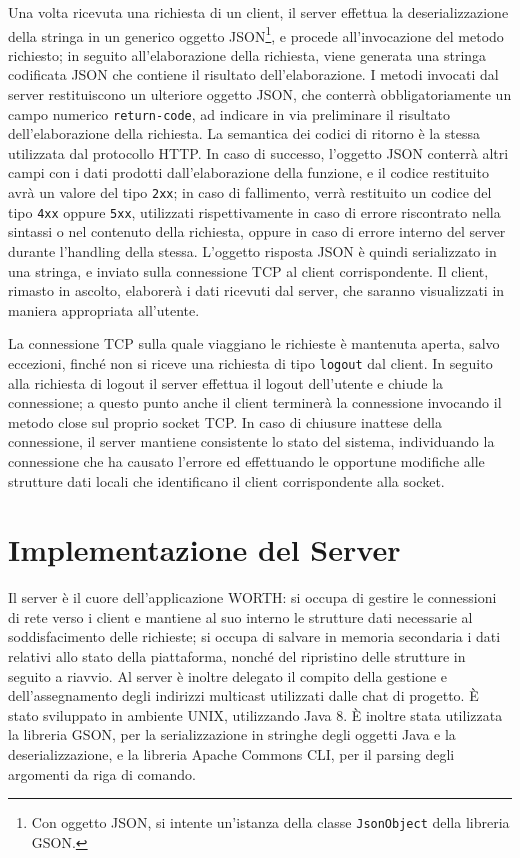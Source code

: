 \documentclass{article}
\begin{document}
Una volta ricevuta una richiesta di un client, il server effettua la deserializzazione della stringa in un generico oggetto JSON\footnote{Con oggetto JSON, si intente un'istanza della classe \texttt{JsonObject} della libreria GSON.}, e procede all'invocazione del metodo richiesto; in seguito all'elaborazione della richiesta, viene generata una stringa codificata JSON che contiene il risultato dell'elaborazione. I metodi invocati dal server restituiscono un ulteriore oggetto JSON, che conterrà obbligatoriamente un campo numerico \texttt{return-code}, ad indicare in via preliminare il risultato dell'elaborazione della richiesta. La semantica dei codici di ritorno è la stessa utilizzata dal protocollo HTTP. In caso di successo, l'oggetto JSON conterrà altri campi con i dati prodotti dall'elaborazione della funzione, e il codice restituito avrà un valore del tipo \texttt{2xx}; in caso di fallimento, verrà restituito un codice del tipo \texttt{4xx} oppure \texttt{5xx}, utilizzati rispettivamente in caso di errore riscontrato nella sintassi o nel contenuto della richiesta, oppure in caso di errore interno del server durante l'handling della stessa. L'oggetto risposta JSON è quindi serializzato in una stringa, e inviato sulla connessione TCP al client corrispondente.
Il client, rimasto in ascolto, elaborerà i dati ricevuti dal server, che saranno visualizzati in maniera appropriata all'utente.

La connessione TCP sulla quale viaggiano le richieste è mantenuta aperta, salvo eccezioni, finché non si riceve una richiesta di tipo \texttt{logout} dal client. In seguito alla richiesta di logout il server effettua il logout dell'utente e chiude la connessione; a questo punto anche il client terminerà la connessione invocando il metodo close sul proprio socket TCP. In caso di chiusure inattese della connessione, il server mantiene consistente lo stato del sistema, individuando la connessione che ha causato l'errore ed effettuando le opportune modifiche alle strutture dati locali che identificano il client corrispondente alla socket.

\section{Implementazione del Server}
Il server è il cuore dell'applicazione WORTH: si occupa di gestire le connessioni di rete verso i client e mantiene al suo interno le strutture dati necessarie al soddisfacimento delle richieste; si occupa di salvare in memoria secondaria i dati relativi allo stato della piattaforma, nonché del ripristino delle strutture in seguito a riavvio. Al server è inoltre delegato il compito della gestione e dell'assegnamento degli indirizzi multicast utilizzati dalle chat di progetto.
È stato sviluppato in ambiente UNIX, utilizzando Java 8. È inoltre stata utilizzata la libreria GSON, per la serializzazione in stringhe degli oggetti Java e la deserializzazione, e la libreria Apache Commons CLI, per il parsing degli argomenti da riga di comando.
\end{document}
